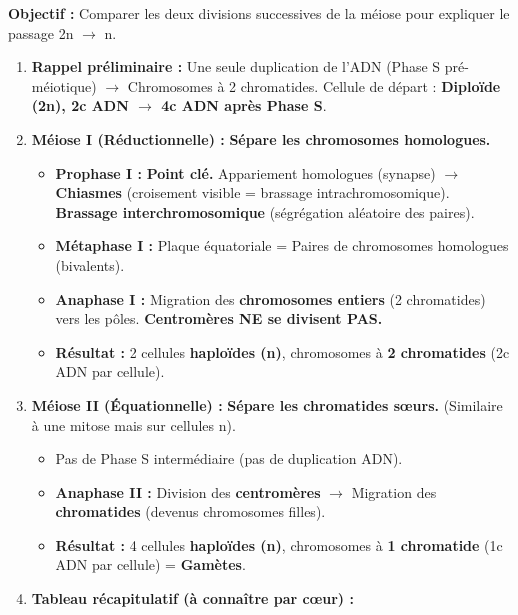\documentclass[11pt]{article}
\newcommand{\cle}[1]{{\popxbold\color{popdark}#1}}
\begin{document}
\begin{methode}
    \textbf{Objectif :} Comparer les deux divisions successives de la \cle{méiose} pour expliquer le passage 2n $\rightarrow$ n.
    \begin{enumerate}
        \item \textbf{Rappel préliminaire :} Une seule duplication de l'ADN (Phase S pré-méiotique) $\rightarrow$ Chromosomes à 2 chromatides. Cellule de départ : \textbf{Diploïde (2n), 2c ADN $\rightarrow$ 4c ADN après Phase S}.
        \item \textbf{Méiose I (Réductionnelle) :} \textbf{Sépare les chromosomes homologues.}
            \begin{itemize}
                \item \textbf{Prophase I :} \textbf{Point clé.} Appariement homologues (synapse) $\rightarrow$ \textbf{Chiasmes} (croisement visible = \cle{brassage intrachromosomique}). \textbf{Brassage interchromosomique} (ségrégation aléatoire des paires).
                \item \textbf{Métaphase I :} Plaque équatoriale = Paires de chromosomes homologues (bivalents).
                \item \textbf{Anaphase I :} Migration des \textbf{chromosomes entiers} (2 chromatides) vers les pôles. \textbf{Centromères NE se divisent PAS.}
                \item \textbf{Résultat :} 2 cellules \textbf{haploïdes (n)}, chromosomes à \textbf{2 chromatides} (2c ADN par cellule).
            \end{itemize}
        \item \textbf{Méiose II (Équationnelle) :} \textbf{Sépare les chromatides sœurs.} (Similaire à une mitose mais sur cellules n).
            \begin{itemize}
                \item Pas de Phase S intermédiaire (pas de duplication ADN).
                \item \textbf{Anaphase II :} Division des \textbf{centromères} $\rightarrow$ Migration des \textbf{chromatides} (devenus chromosomes filles).
                \item \textbf{Résultat :} 4 cellules \textbf{haploïdes (n)}, chromosomes à \textbf{1 chromatide} (1c ADN par cellule) = \textbf{Gamètes}.
            \end{itemize}
        \item \textbf{Tableau récapitulatif (à connaître par cœur) :}

\end{enumerate}
\end{methode}
\end{document}

